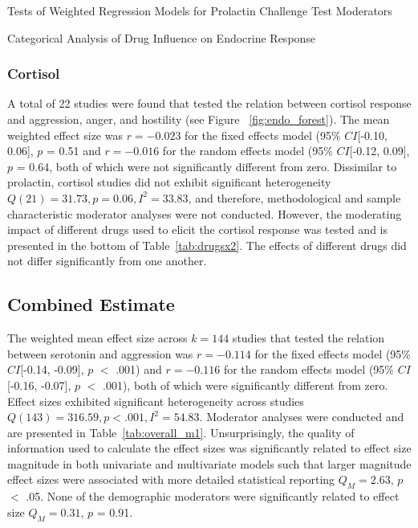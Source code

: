\documentclass[man]{apa6}\usepackage{graphicx, color}
\begin{document}
\begin{table*}
\caption{Tests of Weighted Regression Models for Prolactin Challenge Test Moderators}
\label{tab:endregtab}
\footnotesize{}
\vspace*{.95in}
\end{table*}
 
 
\begin{table*}
\centering
\caption{Categorical Analysis of Drug Influence on Endocrine Response}
\label{tab:drugsx2}
\small{}
\vspace*{.6in}
\end{table*}


\subsubsection{Cortisol}
A total of 22 studies were found that tested the relation between cortisol response and aggression, anger, and hostility (see Figure ~\ref{fig:endo_forest}). The mean weighted effect size was $r = -0.023$ for the fixed effects model (95\% $CI$[-0.10, 0.06], $p$ = 0.51 and $r = -0.016$ for the random effects model (95\% $CI$[-0.12, 0.09], $p$ = 0.64, both of which were not significantly different from zero. Dissimilar to prolactin, cortisol studies did not exhibit significant heterogeneity \ensuremath{Q(21) = 31.73, p = 0.06, I^2 = 33.83}, and therefore, methodological and sample characteristic moderator analyses were not conducted. However, the moderating impact of different drugs used to elicit the cortisol response was tested and is presented in the bottom of Table~\ref{tab:drugsx2}. The effects of different drugs did not differ significantly from one another.


\subsection{Combined Estimate} 


The weighted mean effect size across $k = 144$ studies that tested the relation between serotonin and aggression was $r = -0.114$ for the fixed effects model (95\% $CI$[-0.14, -0.09], $p$ $<$ .001) and $r = -0.116$ for the random effects model (95\% $CI$[-0.16, -0.07], $p$ $<$ .001), both of which were significantly different from zero. Effect sizes exhibited significant heterogeneity across studies \ensuremath{Q(143) = 316.59, p < .001, I^2 = 54.83}. Moderator analyses were conducted and are presented in Table~\ref{tab:overall_m1}. Unsurprisingly, the quality of information used to calculate the effect sizes was significantly related to effect size magnitude in both univariate and multivariate models such that larger magnitude effect sizes were associated with more detailed statistical reporting $Q_M = 2.63$, $p$ $<$ .05. None of the demographic moderators were significantly related to effect size $Q_M = 0.31$, $p$ = 0.91.
\end{document}
